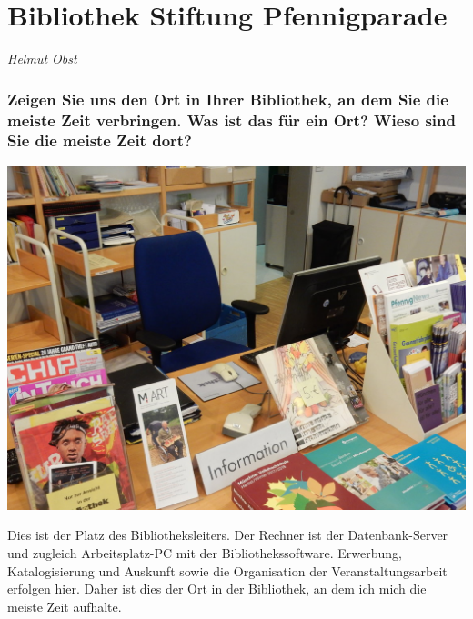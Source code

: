 
\vspace*{.5cm}
\section{Bibliothek Stiftung Pfennigparade}
\begin{center}
\emph{Helmut Obst}
\end{center}
\vspace*{1cm}
\hypertarget{zeigen-sie-uns-den-ort-in-ihrer-bibliothek-an-dem-sie-die-meiste-zeit-verbringen.-was-ist-das-fuxfcr-ein-ort-wieso-sind-sie-die-meiste-zeit-dort}{%
\subsubsection*{Zeigen Sie uns den Ort in Ihrer Bibliothek, an dem Sie die
meiste Zeit verbringen. Was ist das für ein Ort? Wieso sind Sie die
meiste Zeit
dort?}\label{zeigen-sie-uns-den-ort-in-ihrer-bibliothek-an-dem-sie-die-meiste-zeit-verbringen.-was-ist-das-fuxfcr-ein-ort-wieso-sind-sie-die-meiste-zeit-dort}}

\begin{center}
\includegraphics{stiftung-pfennigparade/img/arbeitsplatz.jpg}
\end{center}

Dies ist der Platz des Bibliotheksleiters. Der Rechner ist der
Datenbank-Server und zugleich Arbeitsplatz-PC mit der
Bibliothekssoftware. Erwerbung, Katalogisierung und Auskunft sowie die
Organisation der Veranstaltungsarbeit erfolgen hier. Daher ist dies der
Ort in der Bibliothek, an dem ich mich die meiste Zeit aufhalte.

